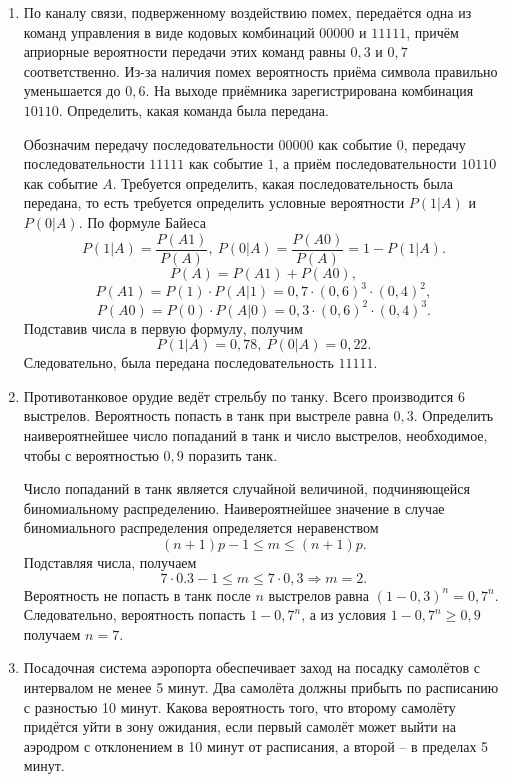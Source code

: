 \begin{enumerate}
    \item По каналу связи, подверженному воздействию помех, передаётся одна из
        команд управления в виде кодовых комбинаций \( 00000 \) и \( 11111 \),
        причём априорные вероятности передачи этих команд равны \( 0,3 \) и
        \( 0,7 \) соответственно. Из-за наличия помех вероятность приёма символа
        правильно уменьшается до \( 0,6 \). На выходе приёмника зарегистрирована
        комбинация \( 10110 \). Определить, какая команда была передана.

        Обозначим передачу последовательности \( 00000 \) как событие \( 0 \),
        передачу последовательности \( 11111 \) как событие \( 1 \), а приём
        последовательности \( 10110 \) как событие \( A \). Требуется
        определить, какая последовательность была передана, то есть требуется
        определить условные вероятности \( P(1|A) \) и \( P(0|A) \). По формуле
        Байеса
        \[
            P(1|A) = \frac{P(A1)}{P(A)},\ P(0|A) = \frac{P(A0)}{P(A)} =
            1 - P(1|A).
        \]
        \[
            P(A) = P(A1) + P(A0),
        \]
        \[
            P(A1) = P(1) \cdot P(A|1) = 0,7\cdot(0,6)^3\cdot(0,4)^2,
        \]
        \[
            P(A0) = P(0) \cdot P(A|0) = 0,3\cdot(0,6)^2\cdot(0,4)^3.
        \]
        Подставив числа в первую формулу, получим
        \[
            P(1|A) = 0,78,\ P(0|A) = 0,22.
        \]
        Следовательно, была передана последовательность \( 11111 \).

    \item Противотанковое орудие ведёт стрельбу по танку. Всего производится 6
        выстрелов. Вероятность попасть в танк при выстреле равна \( 0,3 \).
        Определить наивероятнейшее число попаданий в танк и число выстрелов,
        необходимое, чтобы с вероятностью \( 0,9 \) поразить танк.

        Число попаданий в танк является случайной величиной, подчиняющейся
        биномиальному распределению. Наивероятнейшее значение в случае
        биномиального распределения определяется неравенством
        \[
            (n+1)p - 1 \le m \le (n+1)p.
        \]
        Подставляя числа, получаем
        \[
            7\cdot0.3 - 1 \le m \le 7\cdot0,3 \Rightarrow m = 2.
        \]
        Вероятность не попасть в танк после \( n \) выстрелов равна
        \( (1 - 0,3)^n = 0,7^n \). Следовательно, вероятность попасть
        \( 1 - 0,7^n \), а из условия \( 1 - 0,7^n \ge 0,9 \) получаем
        \( n = 7 \).

    \item Посадочная система аэропорта обеспечивает заход на посадку самолётов с
        интервалом не менее 5 минут. Два самолёта должны прибыть по расписанию с
        разностью 10 минут. Какова вероятность того, что второму самолёту
        придётся уйти в зону ожидания, если первый самолёт может выйти на
        аэродром с отклонением в 10 минут от расписания, а второй -- в пределах
        5 минут.
\end{enumerate}
